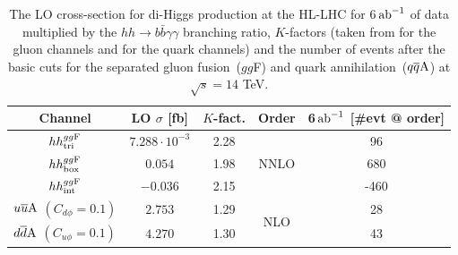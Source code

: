 \begin{table}[t]
	\centering
	\begin{tabular}{ccccc}
		\toprule
		Channel	        &LO $\sigma $ [fb]	&$K$-fact.	&Order&6$\,{\rm ab}^{-1}$ [\#evt @ order]   \\
		\midrule
		$hh^{gg\rm F}_{\rm tri}$	        &  $7.288 \cdot10^{-3}$    & 2.28 &\multirow{3}{*}{NNLO}   &  96   \\ 
		$hh^{gg\rm F}_{\rm box}$            & $0.054$    & 1.98 &  & 680   \\ 
		$hh^{gg\rm F}_{\rm int}$            &$-0.036$    & 2.15 &  &-460   \\ 
		$u\overline u \rm A$ $(C_{d\phi}=0.1)$ &  $2.753$    & 1.29&\multirow{2}{*}{NLO} &  28   \\ 
		$d\overline d \rm A$ $(C_{u\phi}=0.1)$ &  $4.270$    & 1.30 & &  43   \\ 
		\bottomrule
	\end{tabular}
	\caption{  The LO cross-section for di-Higgs production at the HL-LHC for 6$\,{\rm ab}^{-1}$ of data multiplied by the $hh \to b \bar b \gamma \gamma$ branching ratio, $K$-factors (taken from \cite{ deFlorian:2021azd} for the gluon channels and \cite{Alasfar:2019pmn} for the quark channels) and the number of events after the basic cuts for the separated gluon fusion~($gg$F) and quark annihilation~($q\overline q \rm A$) at $\sqrt{s}=14$ TeV. }
	\label{tab:kfact}
\end{table}

